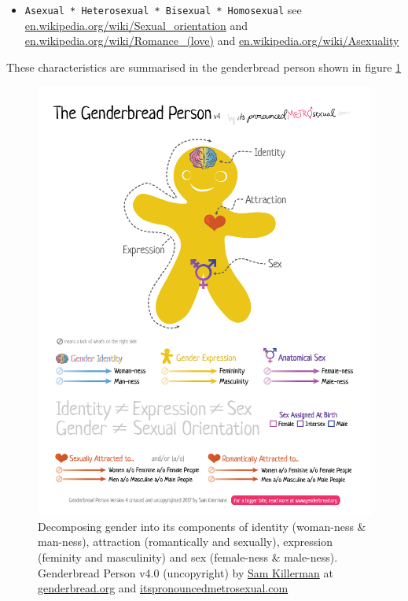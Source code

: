 \documentclass[
]{book}
\providecommand{\tightlist}{%
  \setlength{\itemsep}{0pt}\setlength{\parskip}{0pt}}
\begin{document}
\begin{enumerate}
  \begin{itemize}
  \tightlist
  \item
    \texttt{Asexual\ *\ Heterosexual\ *\ Bisexual\ *\ Homosexual} see \href{https://en.wikipedia.org/wiki/Sexual_orientation}{en.wikipedia.org/wiki/Sexual\_orientation} and \href{https://en.wikipedia.org/wiki/Romance_(love)}{en.wikipedia.org/wiki/Romance\_(love)} and \href{https://en.wikipedia.org/wiki/Asexuality}{en.wikipedia.org/wiki/Asexuality}
  \end{itemize}
\end{enumerate}

These characteristics are summarised in the genderbread person shown in figure \ref{fig:genderbread-fig}

\begin{figure}

{\centering \includegraphics[width=1\linewidth]{images/Genderbread-Person-v4} 

}

\caption{Decomposing gender into its components of identity (woman-ness \& man-ness), attraction (romantically and sexually), expression (feminity and masculinity) and sex (female-ness \& male-ness). Genderbread Person v4.0 (uncopyright) by \href{https://www.samkillermann.com/}{Sam Killerman} at \href{https://www.genderbread.org/}{genderbread.org} and \href{https://www.itspronouncedmetrosexual.com/}{itspronouncedmetrosexual.com}}\label{fig:genderbread-fig}
\end{figure}
\end{document}
